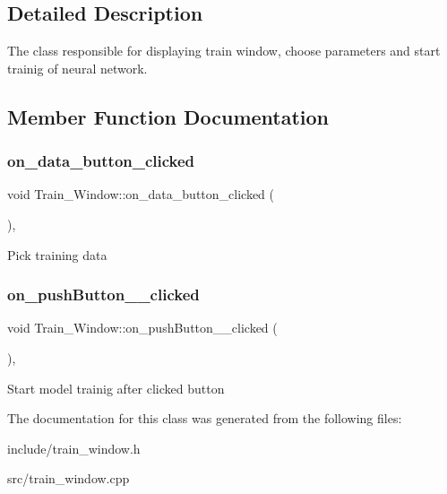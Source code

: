 \subsection{Detailed Description}
The class responsible for displaying train window, choose parameters and start trainig of neural network. 



\subsection{Member Function Documentation}
\mbox{\label{classTrain__Window_a47d45f384226cde0801d7b44cf41bdea}} 
\subsubsection{\texorpdfstring{on\+\_\+data\+\_\+button\+\_\+clicked}{on\_data\_button\_clicked}}
{\footnotesize\ttfamily void Train\+\_\+\+Window\+::on\+\_\+data\+\_\+button\+\_\+clicked (\begin{DoxyParamCaption}{ }\end{DoxyParamCaption})\hspace{0.3cm}{\ttfamily [private]}, {\ttfamily [slot]}}

Pick training data \mbox{\label{classTrain__Window_aab0ec830048b674fd6290900eca39b8c}} 
\subsubsection{\texorpdfstring{on\+\_\+push\+Button\+\_\+\_\+clicked}{on\_pushButton\_2\_clicked}}
{\footnotesize\ttfamily void Train\+\_\+\+Window\+::on\+\_\+push\+Button\+\_\+\_\+clicked (\begin{DoxyParamCaption}{ }\end{DoxyParamCaption})\hspace{0.3cm}{\ttfamily [private]}, {\ttfamily [slot]}}

Start model trainig after clicked button 

The documentation for this class was generated from the following files\+:\begin{DoxyCompactItemize}
\item 
include/train\+\_\+window.\+h\item 
src/train\+\_\+window.\+cpp\end{DoxyCompactItemize}

